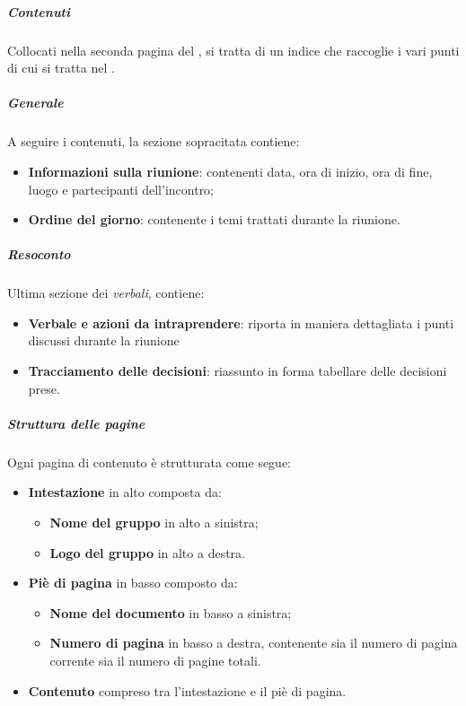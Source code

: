     \subparagraph{Contenuti}
    Collocati nella seconda pagina del \docNameVLow, si tratta di un indice che raccoglie i vari punti di cui si tratta nel \docNameVLow.
    
    \subparagraph{Generale} 
    A seguire i contenuti, la sezione sopracitata contiene:
    \begin {itemize}
        \item \textbf{Informazioni sulla riunione}: contenenti data, ora di inizio, ora di fine, luogo e partecipanti dell'incontro;
        \item \textbf{Ordine del giorno}: contenente i temi trattati durante la riunione.
    \end {itemize}
    
    \subparagraph{Resoconto}
    Ultima sezione dei \textit{verbali}, contiene:
    \begin{itemize}
        \item \textbf{Verbale e azioni da intraprendere}: riporta in maniera dettagliata i punti discussi durante la riunione
        \item \textbf{Tracciamento delle decisioni}: riassunto in forma tabellare delle decisioni prese.
    \end{itemize}

    \subparagraph{Struttura delle pagine}
    Ogni pagina di contenuto è strutturata come segue:
    \begin {itemize}
        \item \textbf{Intestazione} in alto composta da:
        \begin {itemize}
            \item \textbf{Nome del gruppo} in alto a sinistra;
            \item \textbf{Logo del gruppo} in alto a destra.
        \end{itemize}
        \item \textbf{Piè di pagina} in basso composto da:
        \begin{itemize}
            \item \textbf{Nome del documento} in basso a sinistra;
            \item \textbf{Numero di pagina} in basso a destra, contenente sia il numero di pagina corrente sia il numero di pagine totali.
        \end {itemize}
            \item \textbf{Contenuto} compreso tra l'intestazione e il piè di pagina.
    \end {itemize}




